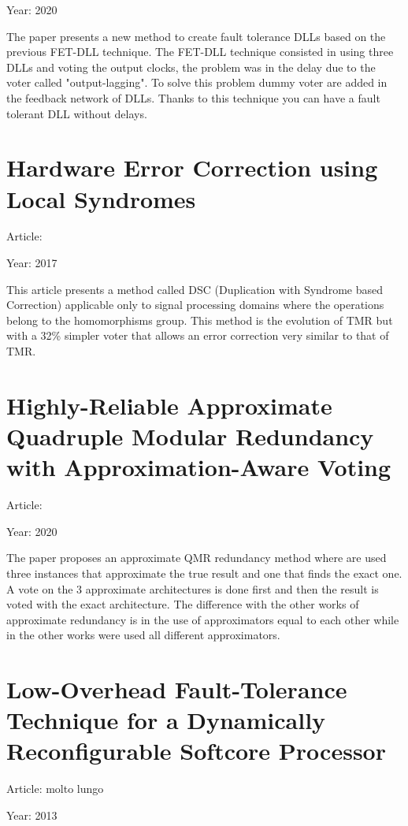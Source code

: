 {{		Year: 2020 
			
		The paper presents a new method to create fault tolerance DLLs based on the previous FET-DLL technique. The FET-DLL technique consisted in using three DLLs and voting the output clocks, the problem was in the delay due to the voter called "output-lagging". To solve this problem dummy voter are added in the feedback network of DLLs. Thanks to this technique you can have a fault tolerant DLL without delays.
		
	}
	\section{Hardware Error Correction using Local Syndromes}{
		Article: \cite{Hardware_error_correction_using_local_syndromes}
		
		Year: 2017	
		
		This article presents a method called DSC (Duplication with Syndrome based Correction) applicable only to signal processing domains where the operations belong to the homomorphisms group. This method is the evolution of TMR but with a 32\% simpler voter that allows an error correction very similar to that of TMR.
	}
	\section{Highly-Reliable Approximate Quadruple Modular Redundancy with Approximation-Aware Voting }{
		Article: \cite{Highly-Reliable_Approximate_Quadruple_Modular_Redundancy_with_Approximation-Aware_Voting}
		
		Year: 2020
		
		The paper proposes an approximate QMR redundancy method where are used three instances that approximate the true result and one that finds the exact one. A vote on the 3 approximate architectures is done first and then the result is voted with the exact architecture. The difference with the other works of approximate redundancy is in the use of approximators equal to each other while in the other works were used all different approximators.
	}
	\section{Low-Overhead Fault-Tolerance Technique for a Dynamically Reconfigurable Softcore Processor } {
		Article: molto lungo \cite{Low-overhead_fault-tolerance_technique_for_a_dynamically_reconfigurable_softcore_processor}
		
		Year: 2013
		
}}
